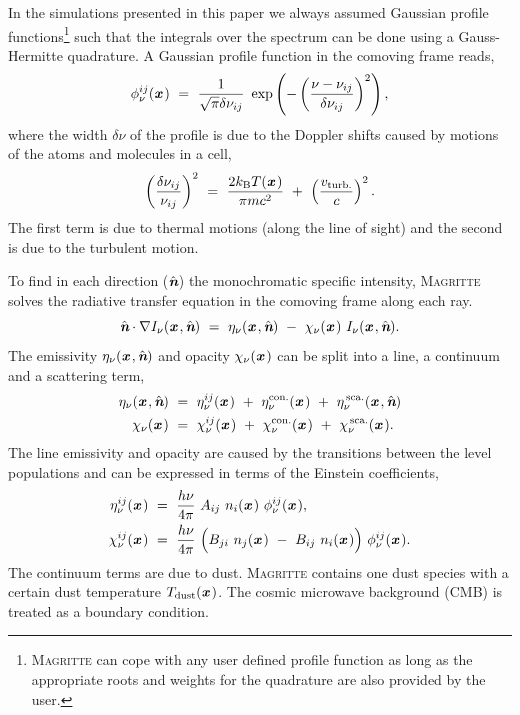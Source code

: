 \documentclass[a4paper,fleqn,usenatbib]{mnras}
\newcommand{\kb}{k_{\text{B}}}
\newcommand{\x}{{\textit{\textbf{x}}}\,}
\newcommand{\n}{\hat{\textit{\textbf{n}}}}
\begin{document}
In the simulations presented in this paper we always assumed Gaussian profile functions\footnote{\textsc{Magritte} can cope with any user defined profile function as long as the appropriate roots and weights for the quadrature are also provided by the user.} such that the integrals over the spectrum can be done using a Gauss-Hermitte quadrature. A Gaussian profile function in the comoving frame reads,
\begin{equation}
	\phi_{\nu}^{ij}(\x) \ = \ \frac{1}{\sqrt{\pi}\delta\nu_{ij}} \ \exp \left(-\left(\frac{\nu-\nu_{ij}} {\delta\nu_{ij}}\right)^{2}\right),
\end{equation}
where the width $\delta\nu$ of the profile is due to the Doppler shifts caused by motions of the atoms and molecules in a cell,
\begin{equation}
	\left(\frac{\delta\nu_{ij}}{\nu_{ij}}\right)^{2} \ = \ \frac{2 \kb T(\x)}{\pi mc^{2}} \ + \ \left(\frac{v_{\text{turb.}}}{c}\right)^{2}.
\end{equation}
The first term is due to thermal motions (along the line of sight) and the second is due to the turbulent motion.

To find in each direction ($\n$) the monochromatic specific intensity, \textsc{Magritte} solves the radiative transfer equation in the comoving frame along each ray.
\begin{equation}
	\n \cdot \nabla I_{\nu}(\x,\n) \ = \ \eta_{\nu}(\x,\n) \ - \ \chi_{\nu}(\x) \ I_{\nu}(\x,\n).
\label{transfer}
\end{equation}
The emissivity $\eta_{\nu}(\x,\n)$ and opacity $\chi_{\nu}(\x)$ can be split into a line, a continuum and a scattering term,
\begin{equation}
\begin{split}
		\eta_{\nu}(\x,\n) \ &= \ \eta^{ij}_{\nu}(\x) \ + \ \eta^{\text{con.}}_{\nu}(\x) \ + \ \eta^{\,\text{sca.}}_{\nu}(\x,\n) \\
		\chi_{\nu}(\x)   \ &= \ \chi^{ij}_{\nu}(\x) \ + \ \chi^{\text{con.}}_{\nu}(\x) \ + \ \chi^{\,\text{sca.}}_{\nu}(\x).
\end{split}
\label{scattering}
\end{equation}
The line emissivity and opacity are caused by the transitions between the level populations and can be expressed in terms of the Einstein coefficients,
\begin{equation}
\begin{split}
\eta^{ij}_{\nu}(\x) \ &= \ \frac{h\nu}{4\pi} \ A_{ij} \ n_{i}(\x) \ \phi^{ij}_{\nu}(\x), \\
\chi^{ij}_{\nu}(\x) \ &= \ \frac{h\nu}{4\pi} \ \Big( B_{ji} \ n_{j}(\x) \ - \ B_{ij} \ n_{i}(\x) \Big) \ \phi^{ij}_{\nu}(\x).
\end{split}
\end{equation}
The continuum terms are due to dust. \textsc{Magritte} contains one dust species with a certain dust temperature $T_{\text{dust}}(\x)$. The cosmic microwave background (CMB) is treated as a boundary condition.
\end{document}
